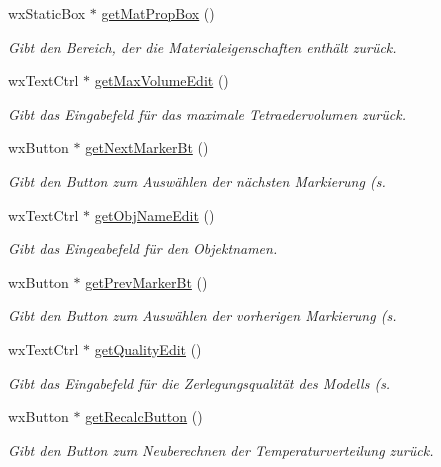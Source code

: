 \begin{DoxyCompactItemize}
wx\-Static\-Box $\ast$ \hyperlink{classPropertiesBox_a152592fad06b248540565859e6747602}{get\-Mat\-Prop\-Box} ()
\begin{DoxyCompactList}\small\item\em Gibt den Bereich, der die Materialeigenschaften enthält zurück. \end{DoxyCompactList}\item 
wx\-Text\-Ctrl $\ast$ \hyperlink{classPropertiesBox_ade5cd5f8ad6d86a777844ff00e199cf7}{get\-Max\-Volume\-Edit} ()
\begin{DoxyCompactList}\small\item\em Gibt das Eingabefeld für das maximale Tetraedervolumen zurück. \end{DoxyCompactList}\item 
wx\-Button $\ast$ \hyperlink{classPropertiesBox_a48eb0273411c2312509c20fd499cd068}{get\-Next\-Marker\-Bt} ()
\begin{DoxyCompactList}\small\item\em Gibt den Button zum Auswählen der nächsten Markierung (s. \end{DoxyCompactList}\item 
wx\-Text\-Ctrl $\ast$ \hyperlink{classPropertiesBox_a012e6f4ebf8bf3443b72fff9c313aa3b}{get\-Obj\-Name\-Edit} ()
\begin{DoxyCompactList}\small\item\em Gibt das Eingeabefeld für den Objektnamen. \end{DoxyCompactList}\item 
wx\-Button $\ast$ \hyperlink{classPropertiesBox_a4e97de926ac7efd390e166c5f17445c9}{get\-Prev\-Marker\-Bt} ()
\begin{DoxyCompactList}\small\item\em Gibt den Button zum Auswählen der vorherigen Markierung (s. \end{DoxyCompactList}\item 
wx\-Text\-Ctrl $\ast$ \hyperlink{classPropertiesBox_a7bad07488cb993a3eb6ec85763d2469b}{get\-Quality\-Edit} ()
\begin{DoxyCompactList}\small\item\em Gibt das Eingabefeld für die Zerlegungsqualität des Modells (s. \end{DoxyCompactList}\item 
wx\-Button $\ast$ \hyperlink{classPropertiesBox_a175c8202f9356211dbb9e3afced44347}{get\-Recalc\-Button} ()
\begin{DoxyCompactList}\small\item\em Gibt den Button zum Neuberechnen der Temperaturverteilung zurück. \end{DoxyCompactList}\item 

\end{DoxyCompactItemize}
